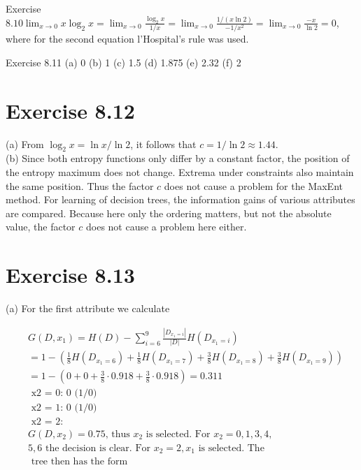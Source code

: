 \documentclass[10pt]{book}
\begin{document}
Exercise $8.10 \lim _{x \rightarrow 0} x \log _{2} x=\lim _{x \rightarrow 0} \frac{\log _{2} x}{1 / x}=\lim _{x \rightarrow 0} \frac{1 /(x \ln 2)}{-1 / x^{2}}=\lim _{x \rightarrow 0} \frac{-x}{\ln 2}=0$, where for the second equation l'Hospital's rule was used.


Exercise 8.11 (a) 0 (b) 1 (c) 1.5 (d) 1.875 (e) 2.32 (f) 2

\section*{Exercise 8.12}
(a) From $\log _{2} x=\ln x / \ln 2$, it follows that $c=1 / \ln 2 \approx 1.44$.\\
(b) Since both entropy functions only differ by a constant factor, the position of the entropy maximum does not change. Extrema under constraints also maintain the same position. Thus the factor $c$ does not cause a problem for the MaxEnt method. For learning of decision trees, the information gains of various attributes are compared. Because here only the ordering matters, but not the absolute value, the factor $c$ does not cause a problem here either.

\section*{Exercise 8.13}
(a) For the first attribute we calculate

$$
\begin{aligned}
& G\left(D, x_{1}\right)=H(D)-\sum_{i=6}^{9} \frac{\left|D_{x_{1}=i}\right|}{|D|} H\left(D_{x_{1}=i}\right) \\
& =1-\left(\frac{1}{8} H\left(D_{x_{1}=6}\right)+\frac{1}{8} H\left(D_{x_{1}=7}\right)+\frac{3}{8} H\left(D_{x_{1}=8}\right)+\frac{3}{8} H\left(D_{x_{1}=9}\right)\right) \\
& =1-\left(0+0+\frac{3}{8} \cdot 0.918+\frac{3}{8} \cdot 0.918\right)=0.311 \\
& \text { x2 = 0: 0 (1/0) } \\
& \text { x2 = 1: } 0 \text { (1/0) } \\
& \text { x2 = 2: } \\
& G\left(D, x_{2}\right)=0.75 \text {, thus } x_{2} \text { is selected. For } x_{2}=0,1,3,4, \\
& 5,6 \text { the decision is clear. For } x_{2}=2, x_{1} \text { is selected. The } \\
& \text { tree then has the form }
\end{aligned}
$$
\end{document}
